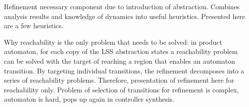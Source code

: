 Refinement necessary component due to introduction of abstraction.
Combines analysis results and knowledge of dynamics into useful heuristics.
Presented here are a few heuristics.

Why reachability is the only problem that needs to be solved: in product automaton, for each copy of the LSS abstraction states a reachability problem can be solved with the target of reaching a region that enables an automaton transition.
By targeting individual transitions, the refinement decomposes into a series of reachability problems.
Therefore, presentation of refinement here for reachability only.
Problem of selection of transitions for refinement is complex, automaton is hard, pops up again in controller synthesis.

